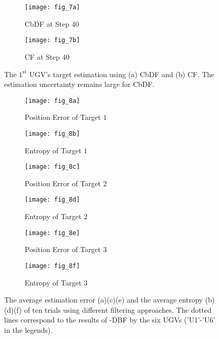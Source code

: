 	\begin{figure}%
		\centering	
		\begin{subfigure}[b]{0.23\textwidth}
			\texttt{[image: fig\_7a]}
			\caption{CbDF at Step 40}\label{fig:cbdf_step40}
		\end{subfigure}	
		\begin{subfigure}[b]{0.23\textwidth}
			\texttt{[image: fig\_7b]}
			\caption{CF at Step 40}\label{fig:cf_step40}
		\end{subfigure}
		\caption{The $1^\text{st}$ UGV's target estimation using (a) CbDF and (b) CF. The estimation uncertainty remains large for CbDF.}
	\end{figure}


	\begin{figure}%
		\centering
		\begin{subfigure}[b]{0.23\textwidth}
			\texttt{[image: fig\_8a]}
			\caption{Position Error of Target $1$}\label{fig:lin_pos_err}
		\end{subfigure}				
		\begin{subfigure}[b]{0.23\textwidth}
			\texttt{[image: fig\_8b]}
			\caption{Entropy of Target $1$}\label{fig:lin_ent}
		\end{subfigure}	
		\begin{subfigure}[b]{0.23\textwidth}
			\texttt{[image: fig\_8c]}
			\caption{Position Error of Target $2$}\label{fig:cir_pos_err}
		\end{subfigure}
		\begin{subfigure}[b]{0.23\textwidth}
			\texttt{[image: fig\_8d]}
			\caption{Entropy of Target $2$}\label{fig:cir_ent}
		\end{subfigure}			
		\begin{subfigure}[b]{0.23\textwidth}
			\texttt{[image: fig\_8e]}
			\caption{Position Error of Target $3$}\label{fig:sin_pos_err}
		\end{subfigure}
		\begin{subfigure}[b]{0.23\textwidth}
			\texttt{[image: fig\_8f]}
			\caption{Entropy of Target $3$}\label{fig:sin_ent}
		\end{subfigure}		
		\caption{\textcolor{\revcol}{The average estimation error (a)(c)(e) and the average entropy (b)(d)(f) of ten trials using different filtering approaches. The dotted lines correspond to the results of \proto-DBF by the six UGVs ('U1'-'U6' in the legends).}}
		\label{fig:metrics}
	\end{figure}	

